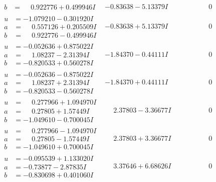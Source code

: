 \documentclass[1p]{elsarticle_modified}
\theoremstyle{definition}
\begin{document}
$$\begin{array}{c|c|c}
\begin{aligned}
b &= \phantom{-}0.922776 + 0.499946 I\end{aligned}
 & -0.83638 - 5.13379 I & \phantom{-0.000000 } 0 \\ \hline\begin{aligned}
u &= -1.079210 - 0.301920 I \\
a &= \phantom{-}0.557126 + 0.205509 I \\
b &= \phantom{-}0.922776 - 0.499946 I\end{aligned}
 & -0.83638 + 5.13379 I & \phantom{-0.000000 } 0 \\ \hline\begin{aligned}
u &= -0.052636 + 0.875022 I \\
a &= \phantom{-}1.08237 - 2.31394 I \\
b &= -0.820533 + 0.560278 I\end{aligned}
 & -1.84370 - 0.44111 I & \phantom{-0.000000 } 0 \\ \hline\begin{aligned}
u &= -0.052636 - 0.875022 I \\
a &= \phantom{-}1.08237 + 2.31394 I \\
b &= -0.820533 - 0.560278 I\end{aligned}
 & -1.84370 + 0.44111 I & \phantom{-0.000000 } 0 \\ \hline\begin{aligned}
u &= \phantom{-}0.277966 + 1.094970 I \\
a &= \phantom{-}0.27805 + 1.57449 I \\
b &= -1.049610 - 0.700045 I\end{aligned}
 & \phantom{-}2.37803 - 3.36677 I & \phantom{-0.000000 } 0 \\ \hline\begin{aligned}
u &= \phantom{-}0.277966 - 1.094970 I \\
a &= \phantom{-}0.27805 - 1.57449 I \\
b &= -1.049610 + 0.700045 I\end{aligned}
 & \phantom{-}2.37803 + 3.36677 I & \phantom{-0.000000 } 0 \\ \hline\begin{aligned}
u &= -0.095539 + 1.133020 I \\
a &= -0.73877 - 2.87835 I \\
b &= -0.830698 + 0.401060 I\end{aligned}
 & \phantom{-}3.37646 + 6.68626 I & \phantom{-0.000000 } 0 \\ \hline\begin{aligned}

\end{aligned}
\end{array}$$
\end{document}
